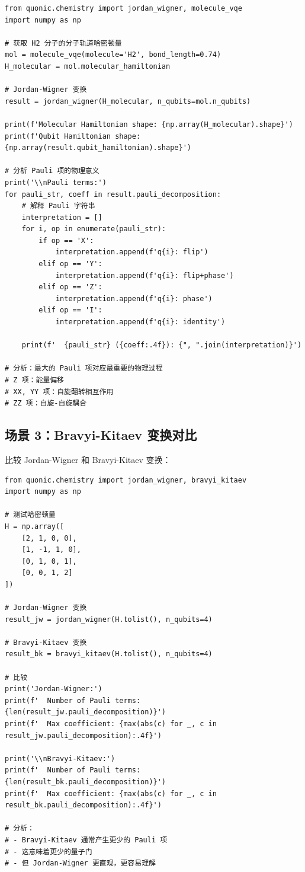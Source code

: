 \documentclass[12pt,a4paper]{article}
\begin{document}
\begin{verbatim}
from quonic.chemistry import jordan_wigner, molecule_vqe
import numpy as np

# 获取 H2 分子的分子轨道哈密顿量
mol = molecule_vqe(molecule='H2', bond_length=0.74)
H_molecular = mol.molecular_hamiltonian

# Jordan-Wigner 变换
result = jordan_wigner(H_molecular, n_qubits=mol.n_qubits)

print(f'Molecular Hamiltonian shape: {np.array(H_molecular).shape}')
print(f'Qubit Hamiltonian shape: {np.array(result.qubit_hamiltonian).shape}')

# 分析 Pauli 项的物理意义
print('\\nPauli terms:')
for pauli_str, coeff in result.pauli_decomposition:
    # 解释 Pauli 字符串
    interpretation = []
    for i, op in enumerate(pauli_str):
        if op == 'X':
            interpretation.append(f'q{i}: flip')
        elif op == 'Y':
            interpretation.append(f'q{i}: flip+phase')
        elif op == 'Z':
            interpretation.append(f'q{i}: phase')
        elif op == 'I':
            interpretation.append(f'q{i}: identity')

    print(f'  {pauli_str} ({coeff:.4f}): {", ".join(interpretation)}')

# 分析：最大的 Pauli 项对应最重要的物理过程
# Z 项：能量偏移
# XX, YY 项：自旋翻转相互作用
# ZZ 项：自旋-自旋耦合
\end{verbatim}

\subsection{场景 3：Bravyi-Kitaev 变换对比}

比较 Jordan-Wigner 和 Bravyi-Kitaev 变换：

\begin{verbatim}
from quonic.chemistry import jordan_wigner, bravyi_kitaev
import numpy as np

# 测试哈密顿量
H = np.array([
    [2, 1, 0, 0],
    [1, -1, 1, 0],
    [0, 1, 0, 1],
    [0, 0, 1, 2]
])

# Jordan-Wigner 变换
result_jw = jordan_wigner(H.tolist(), n_qubits=4)

# Bravyi-Kitaev 变换
result_bk = bravyi_kitaev(H.tolist(), n_qubits=4)

# 比较
print('Jordan-Wigner:')
print(f'  Number of Pauli terms: {len(result_jw.pauli_decomposition)}')
print(f'  Max coefficient: {max(abs(c) for _, c in result_jw.pauli_decomposition):.4f}')

print('\\nBravyi-Kitaev:')
print(f'  Number of Pauli terms: {len(result_bk.pauli_decomposition)}')
print(f'  Max coefficient: {max(abs(c) for _, c in result_bk.pauli_decomposition):.4f}')

# 分析：
# - Bravyi-Kitaev 通常产生更少的 Pauli 项
# - 这意味着更少的量子门
# - 但 Jordan-Wigner 更直观，更容易理解
\end{verbatim}
\end{document}
